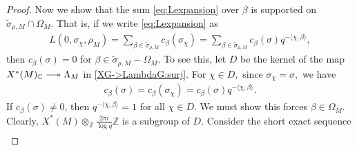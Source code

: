 \documentclass[10pt]{amsart}
\theoremstyle{definition}
\numberwithin{equation}{section}
\DeclareMathOperator{\Hom}{\mathrm{Hom}}
\numberwithin{equation}{subsection}
\newcommand{\ZZ}{\mathbb{Z}}
\newcommand{\CC}{\mathbb{C}}
\begin{document}
\begin{proof}
Now we show that the sum \eqref{eq:Lexpansion} over $\beta$ is supported on $\widetilde{\sigma}_{\rho,M}\cap \Omega_M$. That is, if we write \eqref{eq:Lexpansion} as
\begin{align*}
    L(0,\sigma_\chi,\rho_M) = \sum_{\beta\in\widetilde{\sigma}_{\rho,M}} c_\beta(\sigma_\chi) =\sum_{\beta\in\widetilde{\sigma}_{\rho,M}} c_\beta(\sigma)  q^{-\langle\chi,\beta\rangle},
\end{align*} 
then $c_\beta(\sigma) = 0$ for $\beta\in \widetilde{\sigma}_{\rho,M} - \Omega_M$. 
To see this, let $D$ be the kernel of the map $X^*(M)_\CC\relbar\joinrel\twoheadrightarrow \Lambda_M$ in \eqref{XG->LambdaG:surj}. For $\chi\in D,$ since $\sigma_{\chi} = \sigma,$  we have
\begin{align*}
    c_\beta(\sigma) = c_\beta(\sigma_\chi) = c_\beta(\sigma) q^{-\langle\chi,\beta\rangle}.
\end{align*}
If $c_\beta(\sigma)\neq 0$, then $q^{-\langle\chi,\beta\rangle} = 1$ for all $\chi\in D$. We must show this forces $\beta\in \Omega_M$. Clearly, $X^*(M)\otimes_\ZZ \tfrac{2\pi i}{\log q}\ZZ$ is a subgroup of $D$. Consider the short exact sequence
\begin{align*}

\end{align*}
\end{proof}
\end{document}
